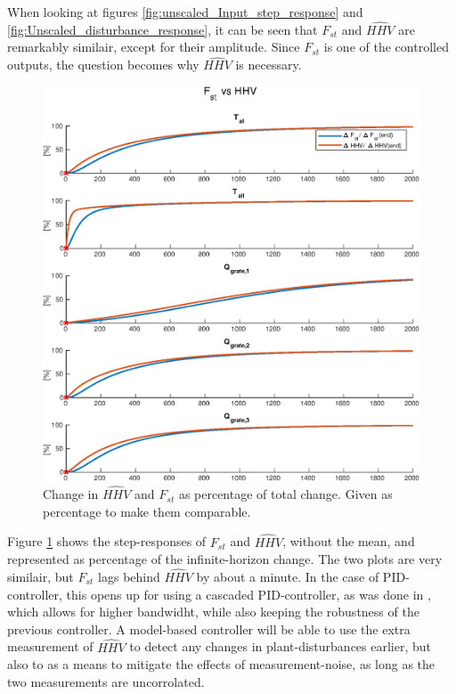 When looking at figures \ref{fig:unscaled_Input_step_response} and \ref{fig:Unscaled_disturbance_response}, it can be seen that $F_{st}$ and $\hat{HHV}$ are remarkably similair, except for their amplitude. Since $F_{st}$ is one of the controlled outputs, the question becomes why $\hat{HHV}$ is necessary. 
\begin{figure}[!ht]
    \includegraphics[width=\textwidth]{img/Simple_analysis_plots/Compare_F_st_to_HHV.eps}
    \caption{Change in $\hat{HHV}$ and $F_{st}$ as percentage of total change. Given as percentage to make them comparable.}
    \label{fig:F_st_vs_HHV}
\end{figure}
\noindent
Figure \ref{fig:F_st_vs_HHV} shows the step-responses of  $F_{st}$ and $\hat{HHV}$, without the mean, and represented as percentage of the infinite-horizon change. The two plots are very similair, but $F_{st}$ lags behind $\hat{HHV}$ by about a minute. In the case of PID-controller, this opens up for using a cascaded PID-controller, as was done in \cite{summer_student}, which allows for higher bandwidht, while also keeping the robustness of the previous controller. A model-based controller will be able to use the extra measurement of $\hat{HHV}$ to detect any changes in plant-disturbances earlier, but also to as a means to mitigate the effects of measurement-noise, as long as the two measurements are uncorrolated. 


